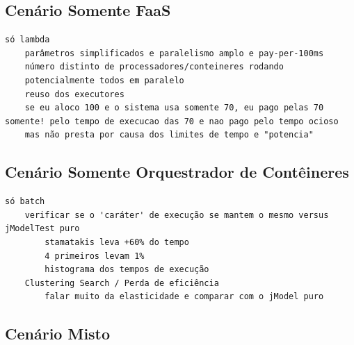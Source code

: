 \documentclass[english,brazilian]{UNISINOSmonografia} %
\begin{document}


\subsection{Cenário Somente FaaS}
\begin{verbatim}
só lambda
	parâmetros simplificados e paralelismo amplo e pay-per-100ms
	número distinto de processadores/conteineres rodando
	potencialmente todos em paralelo
	reuso dos executores
	se eu aloco 100 e o sistema usa somente 70, eu pago pelas 70 somente! pelo tempo de execucao das 70 e nao pago pelo tempo ocioso
	mas não presta por causa dos limites de tempo e "potencia"
\end{verbatim}


\subsection{Cenário Somente Orquestrador de Contêineres}


\begin{verbatim}
só batch
	verificar se o 'caráter' de execução se mantem o mesmo versus jModelTest puro
		stamatakis leva +60% do tempo
		4 primeiros levam 1%
		histograma dos tempos de execução
	Clustering Search / Perda de eficiência
		falar muito da elasticidade e comparar com o jModel puro
\end{verbatim}


\subsection{Cenário Misto}
\end{document}
